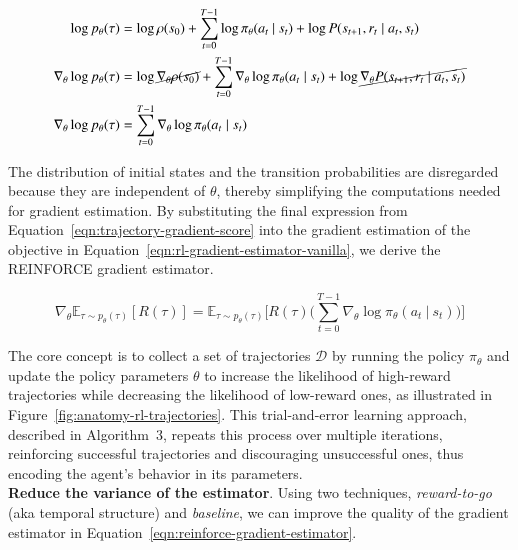 \begin{equation}\label{eqn:trajectory-gradient-score}
    \begin{split}
        \log p_{\theta}(\tau) &= \log \rho(s_0) + \sum_{t=0}^{T-1}\log \pi_{\theta}(a_{t}~|~s_{t}) + \log P(s_{t+1}, r_{t}\mid a_{t}, s_{t}) \\
        \nabla_{\theta}\log p_{\theta}(\tau) &= \log \cancel{\nabla_{\theta}\rho(s_0)} + \sum_{t=0}^{T-1}\nabla_{\theta}\log \pi_{\theta}(a_{t}\mid s_{t}) + \log\cancel{\nabla_{\theta} P(s_{t+1}, r_{t}\mid a_{t}, s_{t})} \\
        \nabla_{\theta} \log p_{\theta}(\tau) &=  \sum_{t=0}^{T-1}\nabla_{\theta}\log \pi_{\theta}(a_{t}\mid s_{t}) 
    \end{split}
\end{equation}

\noindent The distribution of initial states and the transition
probabilities are disregarded because they are independent of $\theta$, thereby simplifying the computations needed for gradient estimation. By substituting the final expression from Equation~\ref{eqn:trajectory-gradient-score} into the gradient estimation of the objective in Equation~\ref {eqn:rl-gradient-estimator-vanilla}, we derive the REINFORCE gradient estimator.

\begin{equation}\label{eqn:reinforce-gradient-estimator}
    \nabla_{\theta}\mathbb{E}_{\tau\sim p_{\theta}(\tau)}[R(\tau)] = \mathbb{E}_{\tau\sim p_{\theta}(\tau)}\bigg[R(\tau)\bigg(\sum_{t=0}^{T-1} \nabla_{\theta}\log \pi_{\theta} (a_t~|~s_t) \bigg)\bigg] 
\end{equation}

\noindent The core concept is to collect a set of trajectories $\mathcal{D}$ 
by running the policy $\pi_{\theta}$ and update the policy parameters $\theta$ to increase the likelihood of high-reward trajectories while decreasing the likelihood of low-reward ones, as illustrated in Figure~\ref{fig:anatomy-rl-trajectories}. This trial-and-error learning approach, described in Algorithm~3, repeats this process over multiple iterations, reinforcing successful trajectories and discouraging unsuccessful ones, thus encoding the agent's behavior in its parameters. \\

\noindent \textbf{Reduce the variance of the estimator}. Using two techniques,
\textit{reward-to-go} (aka temporal structure) and \textit{baseline}, we can improve the quality of the gradient estimator in Equation~\ref{eqn:reinforce-gradient-estimator}. 

